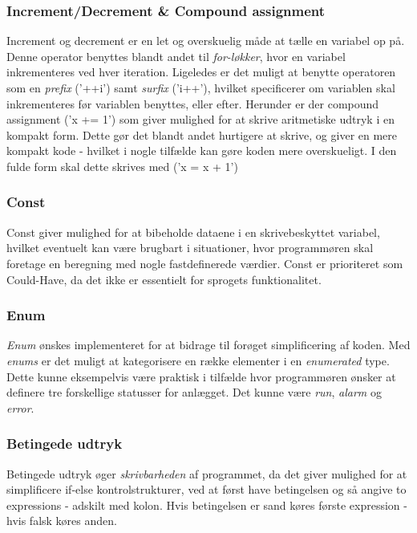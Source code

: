 \subsubsection{Increment/Decrement \& Compound assignment} 
Increment og decrement er en let og overskuelig måde at tælle en variabel op på.
Denne operator benyttes blandt andet til \textit{for-løkker}, hvor en variabel inkrementeres ved hver iteration.
Ligeledes er det muligt at benytte operatoren som en \textit{prefix} ('++i') samt \textit{surfix} ('i++'), hvilket specificerer om variablen skal inkrementeres før variablen benyttes, eller efter.
Herunder er der compound assignment ('x += 1') som giver mulighed for at skrive aritmetiske udtryk i en kompakt form. Dette gør det blandt andet hurtigere at skrive, og giver en mere kompakt kode - hvilket i nogle tilfælde kan gøre koden mere overskueligt. I den fulde form skal dette skrives med ('x = x + 1')

\subsubsection{Const}
Const giver mulighed for at bibeholde dataene i en skrivebeskyttet variabel, hvilket eventuelt kan være brugbart i situationer, hvor programmøren skal foretage en beregning med nogle fastdefinerede værdier. Const er prioriteret som Could-Have, da det ikke er essentielt for sprogets funktionalitet. 

\subsubsection{Enum} 
\textit{Enum} ønskes implementeret for at bidrage til forøget simplificering af koden. Med \textit{enums} er det muligt at kategorisere en række elementer i en \textit{enumerated} type. Dette kunne eksempelvis være praktisk i tilfælde hvor programmøren ønsker at definere tre forskellige statusser for anlægget. Det kunne være \textit{run}, \textit{alarm} og \textit{error}.

\subsubsection{Betingede udtryk}
Betingede udtryk øger \textit{skrivbarheden} af programmet, da det giver mulighed for at simplificere if-else kontrolstrukturer, ved at først have betingelsen og så angive to expressions - adskilt med kolon. Hvis betingelsen er sand køres første expression - hvis falsk køres anden. 

